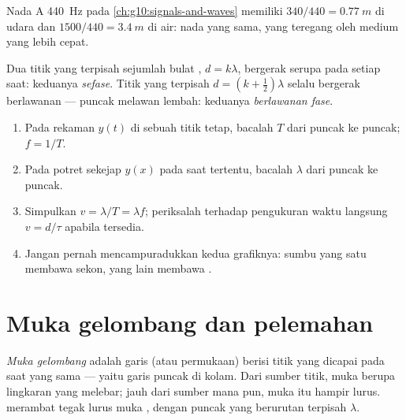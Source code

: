 \begin{example}\label{ex:g12:mechanical-waves:concertA}
Nada A \qty{440}{Hz} pada \cref{ch:g10:signals-and-waves} memiliki
 $340/440 = \qty{0.77}{m}$ di udara dan
$1500/440 =
\qty{3.4}{m}$ di air: nada yang sama, yang teregang oleh
medium yang lebih cepat.
\end{example}

\begin{definition}\label{def:g12:mechanical-waves:phase}
Dua titik yang terpisah sejumlah bulat ,
$d = k\lambda$, bergerak serupa pada setiap saat: keduanya
\emph{sefase}. Titik yang terpisah
$d = (k + \tfrac12)\lambda$ selalu bergerak berlawanan --- puncak
melawan lembah: keduanya \emph{berlawanan fase}.
\end{definition}

\begin{method}\label{met:g12:mechanical-waves:reading}
\begin{enumerate}
  \item Pada rekaman $y(t)$ di sebuah titik tetap, bacalah $T$ dari
        puncak ke puncak; $f = 1/T$.
  \item Pada potret sekejap $y(x)$ pada saat tertentu, bacalah $\lambda$
        dari puncak ke puncak.
  \item Simpulkan $v = \lambda/T = \lambda f$; periksalah terhadap
        pengukuran waktu langsung $v = d/\tau$ apabila tersedia.
  \item Jangan pernah mencampuradukkan kedua grafiknya: sumbu yang satu
        membawa sekon, yang lain membawa .
\end{enumerate}
\end{method}

\section{Muka gelombang dan pelemahan}

\begin{definition}\label{def:g12:mechanical-waves:wavefront}
\emph{Muka gelombang} adalah garis (atau
permukaan) berisi titik yang dicapai  pada saat yang sama
--- yaitu garis puncak di kolam. Dari sumber titik, muka 
berupa lingkaran yang melebar; jauh dari sumber mana pun, muka itu
hampir lurus.  merambat tegak lurus muka ,
dengan puncak yang berurutan terpisah $\lambda$.
\end{definition}

